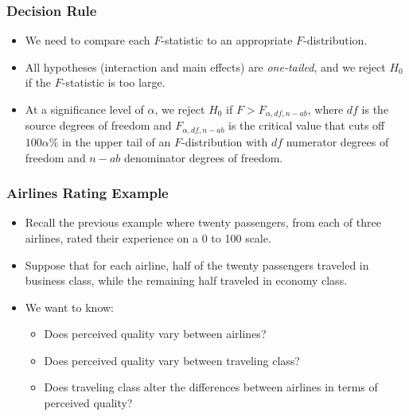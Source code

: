 \documentclass[12pt]{beamer}
\begin{document}
\begin{frame}
	\frametitle{Decision Rule}
	
	\begin{itemize}[label={\color{blue}$\blacktriangleright$}]
		\item We need to compare each $F$-statistic to an appropriate $F$-distribution.
		
		\item All hypotheses (interaction and main effects) are \textit{one-tailed}, and we reject $H_0$ if the $F$-statistic is too large.
		
		\item At a significance level of $\alpha$, we reject $H_0$ if $F > F_{\alpha,df,n-ab}$, where $df$ is the source degrees of freedom and $F_{\alpha,df,n-ab}$ is the critical value that cuts off $100\alpha\%$ in the upper tail of an $F$-distribution with $df$ numerator degrees of freedom and $n-ab$ denominator degrees of freedom.
	\end{itemize}
	
\end{frame}
\begin{frame}
	\frametitle{Airlines Rating Example}
	
	\begin{itemize}[label={\color{blue}$\blacktriangleright$}]
		\item Recall the previous example where twenty passengers, from each of three airlines, rated their experience on a 0 to 100 scale.
		
		\item Suppose that for each airline, half of the twenty passengers traveled in business class, while the remaining half traveled in economy class.
		
		\item We want to know:
		\begin{itemize}[label={\color{blue}$\blacktriangleright$}]
			\item Does perceived quality vary between airlines?
			\item Does perceived quality vary between traveling class?
			\item Does traveling class alter the differences between airlines in terms of perceived quality?
		\end{itemize}
	\end{itemize}
	
\end{frame}
\end{document}
